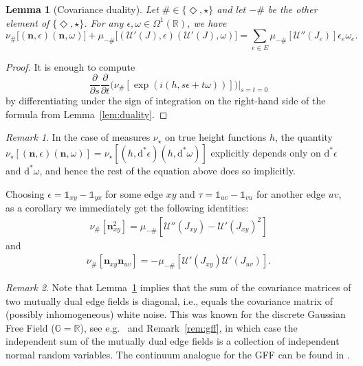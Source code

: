 \documentclass[11pt, reqno]{amsart}
\newtheorem{lemma}[theorem]{Lemma}
\numberwithin{equation}{section}
\theoremstyle{definition}
\theoremstyle{remark}
\newtheorem{remark}{Remark}
\newcommand{\E}{\nu}
\newcommand{\id}{\mathds{1}}
\newcommand{\RR}{\mathbb{R}}
\renewcommand{\d}{\mathrm{d}}
\renewcommand{\c}[1]{\ensuremath{\mathcal{#1}}}
\newcommand{\J}{J}
\newcommand{\n}{\mathbf{n}}
\newcommand{\exact}{\star}
\newcommand{\coclosed}{\Diamond}
\begin{document}
\begin{lemma}[Covariance duality]\label{L: covariance} 
	Let $\# \in \{\coclosed, \exact\}$ and let $-\#$ be the other element of $ \{\coclosed, \exact\}$. For any $\epsilon, \omega \in \Omega^1(\RR)$, we have
	\[
 \E_{\#}\big[(\n, \epsilon)(\n, \omega)\big] + \mu_{-\#} \big[(\c{U}'(\J), \epsilon)(\c{U}'(\J), \omega)\big] = \sum_{e \in E} \mu_{-\#}[\c{U}''(\J_e)] \epsilon_e\omega_e.
	\]
\end{lemma}

\begin{proof}
It is enough to compute 
\[
\frac\partial {\partial s} \frac\partial {\partial t}	\Big(\nu_{\#} [\exp({i (h,s \epsilon +t \omega)}) ] \Big) \Big|_{s =t =0}
\]
by differentiating under the sign of integration on the right-hand side of the formula from Lemma~\ref{lem:duality}.
\end{proof}


\begin{remark}
In the case of measures $\nu_{\exact}$ on true height functions $h$, the quantity $\E_{\exact}[(\n, \epsilon)(\n, \omega)]=\E_{\exact}[(h,\d^* \epsilon)(h,\d^* \omega)]$ explicitly depends only on $\d^*\epsilon$ and $\d^*\omega$, and hence the rest of the equation above does so implicitly.
\end{remark}


Choosing $\epsilon = \id_{xy} - \id_{yx}$ for some edge $xy$ and $\tau = \id_{uv} - \id_{vu}$ for another edge $uv$, as a corollary we immediately get the following identities:
\begin{align} \label{eq:pontwiseD1}
\E_{\#}[\n_{xy}^2] = \mu_{-\#}[ \mathcal U''(J_{xy})- \mathcal U'(J_{xy})^2]
\end{align}
and
\begin{align} \label{eq:pontwiseD2}
\E_{\#}[\n_{xy}\n_{uv}] = -\mu_{-\#}[\c{U}'(\J_{xy})\c{U}'(\J_{uv})].
\end{align}



\begin{remark}
	Note that Lemma~\ref{L: covariance} implies that the sum of the covariance matrices of two mutually dual edge fields is diagonal, i.e., equals the covariance matrix of (possibly inhomogeneous) white noise. This was known for the discrete Gaussian Free Field ($\mathbb G=\mathbb R$), see e.g.~\cite{dubedat2011topics, Aru15} and Remark~\ref{rem:gff}, in which case the independent sum of the mutually dual edge fields is a collection of independent normal random variables. 
	The continuum analogue for the GFF can be found in \cite{AKM}. 
\end{remark}
\end{document}
